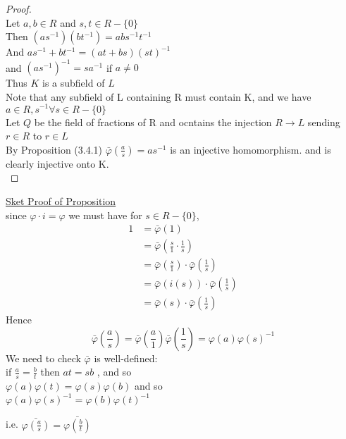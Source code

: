 \documentclass{article}
\begin{document}
    \begin{proof}
        \leavevmode \\ 
        Let $a, b \in R$ and $s, t \in R -\{0\}$ \\ 
        Then $(as^{-1})(bt^{-1}) = abs^{-1}t^{-1}$ \\ 
        And $as^{-1} + bt^{-1} = (at + bs) (st)^{-1}$ \\ 
        and $(as^{-1})^{-1} = sa^{-1} $ if $ a\not = 0$ \\ 
        Thus $K$ is a subfield of $L$ \\ 
        Note that any subfield of L containing R must contain K, and we have $a \in R, s^{-1} \forall s \in R - \{0\}$ \\ 


Let $Q$ be the field of fractions of R and ocntains the injection $R \to L$ sending $r \in R$ to $r \in L$ \\
    By Proposition (3.4.1) $\bar{\varphi }(\frac{a}{s}) = as^{-1}$ is an injective homomorphism.
and is clearly injective onto K. \\ 




    \end{proof}

\underline{Sket Proof of Proposition}
\\ 
since $\varphi \cdot i = \varphi$ we must have for $s \in R - \{0\}$, \begin{align*}
    1 &= \bar{\varphi } (1) \\ 
    & = \bar{\varphi}(\frac{s}{1} \cdot \frac{1}{s})  \\ 
    & = \bar{\varphi}(\frac{s}{1}) \cdot \bar{\varphi}(\frac{1}{s}) \\
    & = \bar{\varphi}(i(s)) \cdot \bar{\varphi}(\frac{1}{s}) \\ 
    & = \bar{\varphi}(s) \cdot \bar{\varphi}(\frac{1}{s})
    \end{align*}
Hence 
$$\bar{\varphi}(\frac{a}{s}) = \bar{\varphi}(\frac{a}{1})\bar{\varphi}(\frac{1}{s}) = \varphi(a) \varphi(s)^{-1}$$
We need to check $\bar{\varphi}$ is well-defined: \\
if $\frac{a}{s} = \frac{b}{t}$ then $at = sb$ , and so \\ 
$\varphi(a) \varphi(t) = \varphi(s) \varphi(b)$ and so \\ 
$\varphi(a) \varphi(s )^{-1} = \varphi(b) \varphi(t)^{-1} $

i.e. $\bar{\varphi(\frac{a}{s})} = \bar{\varphi(\frac{b}{t})}$
\end{document}
